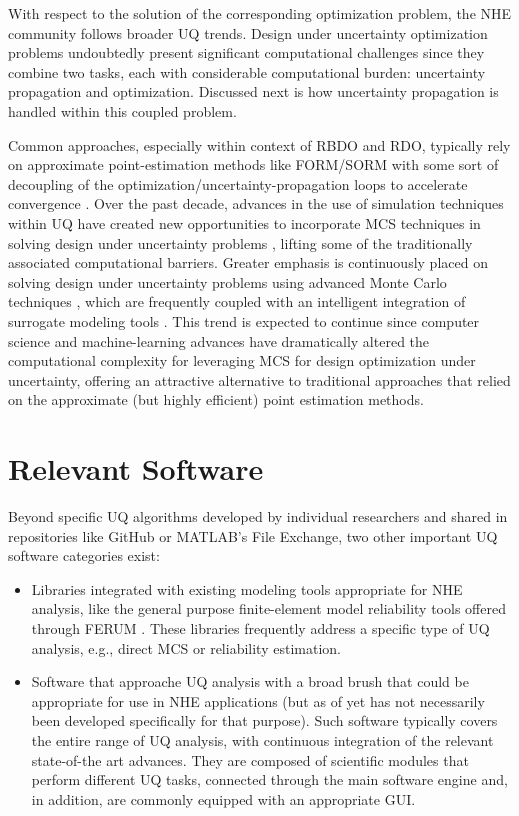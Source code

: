 With respect to the solution of the corresponding optimization problem, the NHE community follows broader UQ trends. Design under uncertainty optimization problems undoubtedly present significant computational challenges since they combine two tasks, each with considerable computational burden: uncertainty propagation and optimization. Discussed next is how uncertainty propagation is handled within this coupled problem.

Common approaches, especially within context of RBDO and RDO, typically rely on approximate point-estimation methods like FORM/SORM \citep{papadimitriou2018reliability} with some sort of decoupling of the optimization/uncertainty-propagation loops to accelerate convergence \citep{beyer2007robust}. Over the past decade, advances in the use of simulation techniques within UQ have created new opportunities to incorporate MCS techniques in solving design under uncertainty problems \citep{spall2003introduction, flint2016developing}, lifting some of the traditionally associated computational barriers. Greater emphasis is continuously placed on solving design under uncertainty problems using advanced Monte Carlo techniques \citep{medina2014adaptive}, which are frequently coupled with an intelligent integration of surrogate modeling tools \citep{dubourg2011reliabilitybased, bichon2013efficient, zhang2018adaptive}. This trend is expected to continue since computer science and machine-learning advances have dramatically altered the computational complexity for leveraging MCS for design optimization under uncertainty, offering an attractive alternative to traditional approaches that relied on the approximate (but highly efficient) point estimation methods.   

\section{Relevant Software}
\label{sec:uq_tools}

Beyond specific UQ algorithms developed by individual researchers and shared in repositories like GitHub or MATLAB's File Exchange, two other important UQ software categories exist:

\begin{itemize}
    \item Libraries integrated with existing modeling tools appropriate for NHE analysis, like the general purpose finite-element model reliability tools offered through FERUM \citep{bourinet2009review}. These libraries frequently address a specific type of UQ analysis, e.g., direct MCS or reliability estimation.

    \item Software that approache UQ analysis with a broad brush that could be appropriate for use in NHE applications (but as of yet has not necessarily been developed specifically for that purpose). Such software typically covers the entire range of UQ analysis, with continuous integration of the relevant state-of-the art advances. They are composed of scientific modules that perform different UQ tasks, connected through the main software engine and, in addition, are commonly equipped with an appropriate GUI. 
\end{itemize}
	
